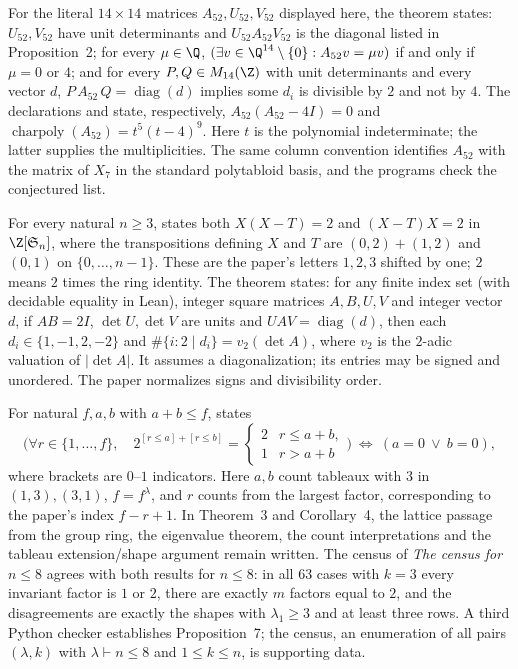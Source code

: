 For the literal $14\times14$ matrices $A_{52},U_{52},V_{52}$ displayed here, the theorem  states: $U_{52},V_{52}$
have unit determinants and $U_{52}A_{52}V_{52}$ is the diagonal listed in
Proposition~2; for every $\mu\in\Q$,
$(\exists v\in\Q^{14}\setminus\{0\}: A_{52}v=\mu v)$ if and only if
$\mu=0$ or $4$; and for every
$P,Q\in M_{14}(\Z)$ with unit determinants and every vector $d$,
$P\,A_{52}\,Q=\operatorname{diag}(d)$ implies some $d_i$ is divisible by $2$
and not by $4$. The declarations\allowbreak{}  and
 state, respectively, $A_{52}(A_{52}-4I)=0$ and
$\operatorname{charpoly}(A_{52})=t^5(t-4)^9$. Here $t$ is the polynomial indeterminate; the latter supplies the
multiplicities. The same column convention identifies $A_{52}$ with the matrix of $X_7$ in the standard polytabloid basis, and the programs check the conjectured list.

For every natural $n\ge3$,  states both
$X(X-T)=2$ and $(X-T)X=2$ in $\Z[\mathfrak S_n]$, where the transpositions defining $X$ and $T$ are $(0,2)+(1,2)$ and $(0,1)$ on $\{0,\dots,n-1\}$. These are the paper's letters
$1,2,3$ shifted by one; $2$ means $2$ times the ring identity.
The theorem  states: for any finite
index set (with decidable equality in Lean), integer square matrices $A,B,U,V$ and
integer vector $d$, if $AB=2I$, $\det U,\det V$ are units and
$UAV=\operatorname{diag}(d)$, then each $d_i\in\{1,-1,2,-2\}$ and
$\#\{i:2\mid d_i\}=v_2(\det A)$, where $v_2$ is the $2$-adic valuation
of $|\det A|$.
It assumes a diagonalization; its entries may be signed and unordered.
The paper normalizes signs and divisibility order.

For natural $f,a,b$ with $a+b\le f$,  states
\[
\bigl(\forall r\in\{1,\dots,f\},\quad
2^{[r\le a]+[r\le b]}=
\begin{cases}2&r\le a+b,\\1&r>a+b\end{cases}\bigr)
\ \Longleftrightarrow\ (a=0\ \lor\ b=0),
\]
where brackets are $0$--$1$ indicators. Here $a,b$ count
tableaux with $3$ in $(1,3),(3,1)$, $f=f^\lambda$, and $r$ counts from the
largest factor, corresponding to the paper's index $f-r+1$.
In Theorem~3 and Corollary~4, the lattice passage from the group ring, the eigenvalue theorem, the count interpretations and the tableau extension/shape argument remain written. The census of \emph{The census for $n\le8$} agrees with both
results for $n\le8$: in all 63 cases with $k=3$ every invariant factor is $1$
or $2$, there are exactly $m$ factors equal to $2$, and the disagreements are
exactly the shapes with $\lambda_1\ge3$ and at least three rows.
A third Python checker establishes Proposition~7;
the census, an enumeration of all pairs $(\lambda,k)$ with $\lambda\vdash n\le8$ and $1\le k\le n$, is supporting data.


